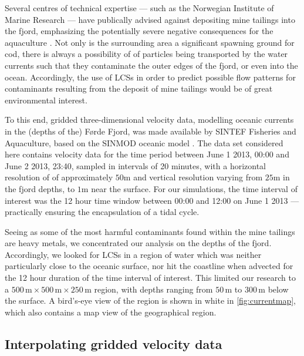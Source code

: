 Several centres of technical expertise --- such as the Norwegian Institute of
Marine Research --- have publically advised against depositing mine tailings
into the fjord, emphasizing the potentially severe negative consequences
for the aquaculture \parencite{haugan2015sjodeponi}. Not only is the surrounding
area a significant spawning ground for cod, there is always a possibility of
of particles being transported by the water currents such that they
contaminate the outer edges of the fjord, or even into the ocean. Accordingly,
the use of LCSs in order to predict possible flow patterns for contaminants
resulting from the deposit of mine tailings would be of great environmental
interest.

To this end, gridded three-dimensional velocity data, modelling oceanic
currents in the (depths of the) Førde Fjord, was made available by SINTEF
Fisheries and Aquaculture, based on the SINMOD oceanic model
\parencite{slagstad2005modeling}. The data set considered here contains velocity
data for the time period between June 1 2013, 00:00 and June 2 2013, 23:40,
sampled in intervals of 20 minutes, with a horizontal resolution of
of approximately $50\si{\meter}$ and vertical resolution varying from
$25\si{\meter}$ in the fjord depths, to $1\si{\meter}$ near the surface. For our
simulations, the time interval of interest was the 12 hour time window between
00:00 and 12:00 on June 1 2013 --- practically ensuring the encapsulation of a
tidal cycle.

Seeing as some of the most harmful contaminants found within the mine tailings
are heavy metals, we concentrated our analysis on the depths of the fjord.
Accordingly, we looked for LCSs in a region of water which was neither
particularly close to the oceanic surface, nor hit the coastline when
advected for the 12 hour duration of the time interval of interest. This
limited our research to a
$500\,\si{\meter}\times500\,\si{\meter}\times250\,\si{\meter}$ region, with
depths ranging from $50\,\si{\meter}$ to $300\,\si{\meter}$ below the
surface. A bird's-eye view of the region is shown in white in
\cref{fig:currentmap}, which also contains a map view of the geographical
region.



\subsection{Interpolating gridded velocity data}
\label{sub:interpolating_gridded_velocity_data}


